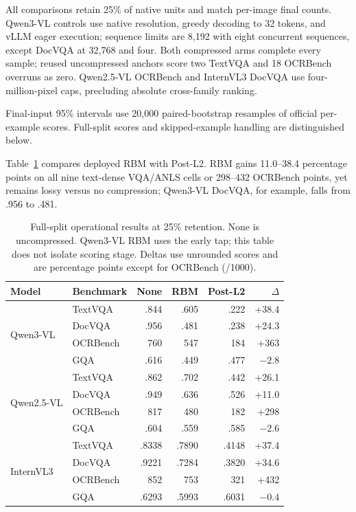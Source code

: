 \documentclass[smallabstract,smallcaptions]{dccpaper}
\begin{document}
All comparisons retain 25\% of native units and match per-image final counts. Qwen3-VL controls use native resolution, greedy decoding to 32 tokens, and vLLM eager execution; sequence limits are 8,192 with eight concurrent sequences, except DocVQA at 32,768 and four. Both compressed arms complete every sample; reused uncompressed anchors score two TextVQA and 18 OCRBench overruns as zero. Qwen2.5-VL OCRBench and InternVL3 DocVQA use four-million-pixel caps, precluding absolute cross-family ranking.

Final-input 95\% intervals use 20,000 paired-bootstrap resamples of official per-example scores. Full-split scores and skipped-example handling are distinguished below.

Table~\ref{tab:main} compares deployed RBM with Post-L2. RBM gains 11.0--38.4 percentage points on all nine text-dense VQA/ANLS cells or 298--432 OCRBench points, yet remains lossy versus no compression; Qwen3-VL DocVQA, for example, falls from .956 to .481.

\begin{table}[t]
\centering
\caption{\label{tab:main}Full-split operational results at 25\% retention. None is uncompressed. Qwen3-VL RBM uses the early tap; this table does not isolate scoring stage. Deltas use unrounded scores and are percentage points except for OCRBench (/1000).}
\small
\setlength{\tabcolsep}{4pt}
\begin{tabular}{llrrrr}
\toprule
Model & Benchmark & None & RBM & Post-L2 & $\Delta$\\
\midrule
\multirow{4}{*}{Qwen3-VL}
& TextVQA & .844 & .605 & .222 & +38.4\\
& DocVQA & .956 & .481 & .238 & +24.3\\
& OCRBench & 760 & 547 & 184 & +363\\
& GQA & .616 & .449 & .477 & $-2.8$\\
\midrule
\multirow{4}{*}{Qwen2.5-VL}
& TextVQA & .862 & .702 & .442 & +26.1\\
& DocVQA & .949 & .636 & .526 & +11.0\\
& OCRBench & 817 & 480 & 182 & +298\\
& GQA & .604 & .559 & .585 & $-2.6$\\
\midrule
\multirow{4}{*}{InternVL3}
& TextVQA & .8338 & .7890 & .4148 & +37.4\\
& DocVQA & .9221 & .7284 & .3820 & +34.6\\
& OCRBench & 852 & 753 & 321 & +432\\
& GQA & .6293 & .5993 & .6031 & $-0.4$\\
\bottomrule
\end{tabular}
\end{table}
\end{document}
